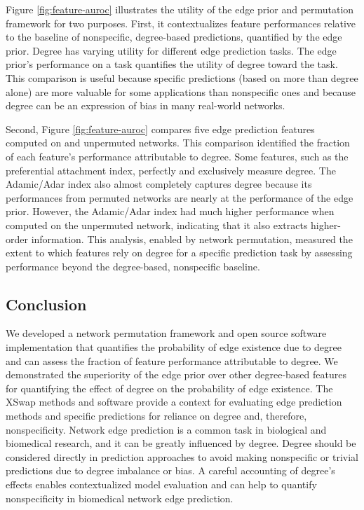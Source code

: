 Figure \ref{fig:feature-auroc} illustrates the utility of the edge prior and permutation framework for two purposes.
First, it contextualizes feature performances relative to the baseline of nonspecific, degree-based predictions, quantified by the edge prior.
Degree has varying utility for different edge prediction tasks.
The edge prior's performance on a task quantifies the utility of degree toward the task.
This comparison is useful because specific predictions (based on more than degree alone) are more valuable for some applications than nonspecific ones and because degree can be an expression of bias in many real-world networks.

Second, Figure \ref{fig:feature-auroc} compares five edge prediction features computed on and unpermuted networks.
This comparison identified the fraction of each feature's performance attributable to degree.
Some features, such as the preferential attachment index, perfectly and exclusively measure degree.
The Adamic/Adar index also almost completely captures degree because its performances from permuted networks are nearly at the performance of the edge prior.
However, the Adamic/Adar index had much higher performance when computed on the unpermuted network, indicating that it also extracts higher-order information.
This analysis, enabled by network permutation, measured the extent to which features rely on degree for a specific prediction task by assessing performance beyond the degree-based, nonspecific baseline.

\hypertarget{conclusion}{%
\subsection{Conclusion}\label{conclusion}}

We developed a network permutation framework and open source software implementation that quantifies the probability of edge existence due to degree and can assess the fraction of feature performance attributable to degree.
We demonstrated the superiority of the edge prior over other degree-based features for quantifying the effect of degree on the probability of edge existence.
The XSwap methods and software provide a context for evaluating edge prediction methods and specific predictions for reliance on degree and, therefore, nonspecificity.
Network edge prediction is a common task in biological and biomedical research, and it can be greatly influenced by degree.
Degree should be considered directly in prediction approaches to avoid making nonspecific or trivial predictions due to degree imbalance or bias.
A careful accounting of degree's effects enables contextualized model evaluation and can help to quantify nonspecificity in biomedical network edge prediction.

